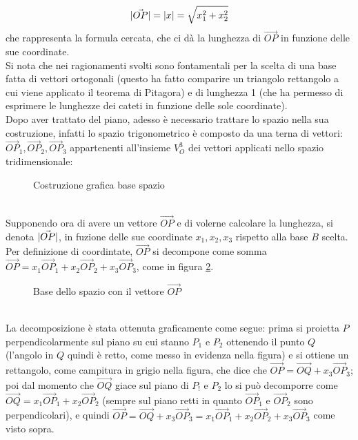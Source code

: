 \begin{equation}
  \label{eq:teoremadiPitapplicatoaAbsOP}
  \lvert\vec{OP}\rvert=\lvert x\rvert=\sqrt{x_1^2+x_2^2}
\end{equation}
che rappresenta la formula cercata, che ci dà la lunghezza di $\vec{OP}$ in funzione delle sue coordinate.\\
Si nota che nei ragionamenti svolti sono fontamentali per la scelta di una base fatta di vettori ortogonali (questo ha fatto comparire un triangolo rettangolo a cui viene applicato il teorema di Pitagora) e di lunghezza 1 (che ha permesso di esprimere le lunghezze dei cateti in funzione delle sole coordinate). \\
Dopo aver trattato del piano, adesso è necessario trattare lo spazio nella sua costruzione, infatti lo spazio trigonometrico è composto da una terna di vettori: $\vec{OP}_1,\vec{OP}_2,\vec{OP}_3$ appartenenti all'insieme $V_O^3$ dei vettori applicati nello spazio tridimensionale:
\begin{figure}[ht!]
  \centering
    \resizebox{4cm}{!}{
      
    }
  \caption{Costruzione grafica base spazio}
  \label{fig:costbasespazio}
\end{figure}\\
Supponendo ora di avere un vettore $\vec{OP}$ e di volerne calcolare la lunghezza, si denota $\lvert\vec{OP}\rvert$, in fuzione delle sue coordinate $x_1,x_2,x_3$ rispetto alla base $B$ scelta. Per definizione di coordintate, $\vec{OP}$ si decompone come somma $\vec{OP}=x_1\vec{OP}_1+x_2\vec{OP}_2+x_3\vec{OP}_3$, come in figura \ref{fig:basedelspazioConVettOP}.
\begin{figure}[ht!]
  \centering
  \resizebox{4cm}{!}{
      
    }
  \caption{Base dello spazio con il vettore $\vec{OP}$}
  \label{fig:basedelspazioConVettOP}
\end{figure}\\
La decomposizione è stata ottenuta graficamente come segue: prima si proietta $P$ perpendicolarmente sul piano su cui stanno $P_1$ e $P_2$ ottenendo il punto $Q$ (l'angolo in $Q$ quindi è retto, come messo in evidenza nella figura) e si ottiene un rettangolo, come campitura in grigio nella figura, che dice che $\vec{OP}=\vec{OQ}+x_3\vec{OP}_3$; poi dal momento che $\vec{OQ}$ giace sul piano di $P_!$ e $P_2$ lo si può decomporre come $\vec{OQ}=x_1\vec{OP}_1+x_2\vec{OP}_2$ (sempre sul piano retti in quanto $\vec{OP}_1$ e $\vec{OP}_2$ sono perpendicolari), e quindi $\vec{OP}=\vec{OQ}+x_3\vec{OP}_3=x_1\vec{OP}_1+x_2\vec{OP}_2+x_3\vec{OP}_3$ come visto sopra.\\
